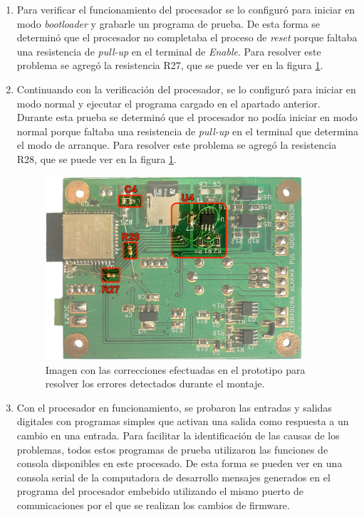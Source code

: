 \begin{enumerate}
	\item Para verificar el funcionamiento del procesador se lo configuró para iniciar en modo \emph{bootloader} y grabarle un programa de prueba. De esta forma se determinó que el procesador no completaba el proceso de \emph{reset} porque faltaba una resistencia de \emph{pull-up} en el terminal de \emph{Enable}. Para resolver este problema se agregó la resistencia R27, que se puede ver en la figura \ref{fig:ErroresPrototipo}.
	
	\item Continuando con la verificación del procesador, se lo configuró para iniciar en modo normal y ejecutar el programa cargado en el apartado anterior. Durante esta prueba se determinó que el procesador no podía iniciar en modo normal porque faltaba una resistencia de \emph{pull-up} en el terminal que determina el modo de arranque. Para resolver este problema se agregó la resistencia R28, que se puede ver en la figura \ref{fig:ErroresPrototipo}.
	
\begin{figure}[ht]
	\centering
	\includegraphics[width=0.9\textwidth]{Figures/LadoSoldadura.png}
	\caption[Errores detectados durante el montaje del prototipo]{Imagen con las correcciones efectuadas en el prototipo para resolver los errores detectados durante el montaje.}
	\label{fig:ErroresPrototipo}
\end{figure}

	\item Con el procesador en funcionamiento, se probaron las entradas y salidas digitales con programas simples que activan una salida como respuesta a un cambio en una entrada. Para facilitar la identificación de las causas de los problemas, todos estos programas de prueba utilizaron las funciones de consola disponibles en este procesado. De esta forma se pueden ver en una consola serial de la computadora de desarrollo mensajes generados en el programa del procesador embebido utilizando el mismo puerto de comunicaciones por el que se realizan los cambios de firmware.
	

\end{enumerate}
